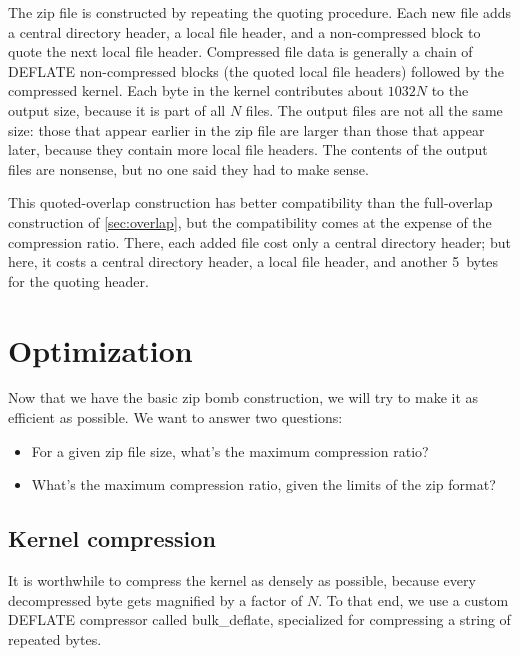 \documentclass[letterpaper,twocolumn,10pt]{article}
\newcommand{\bulkdeflate}{\mbox{bulk\_deflate}}
\begin{document}
The zip file is constructed by repeating the quoting procedure.
Each new file adds a central directory header,
a local file header,
and a non-compressed block to quote the next local file header.
Compressed file data is generally a chain of DEFLATE non-compressed blocks
(the quoted local file headers)
followed by the compressed kernel.
Each byte in the kernel contributes about
$\num{1032}N$ to the output size,
because it is part of all $N$ files.
The output files are not all the same size:
those that appear earlier in the zip file
are larger than those that appear later,
because they contain more local file headers.
The contents of the output files are nonsense,
but no one said they had to make sense.

This quoted-overlap construction has better compatibility
than the full-overlap construction of \autoref{sec:overlap},
but the compatibility comes at the expense of the compression ratio.
There, each added file cost only a central directory header;
but here, it costs a central directory header,
a local file header,
and another \SI{5}{bytes} for the quoting header.


\section{Optimization}
\label{sec:optimization}

Now that we have the basic zip bomb construction,
we will try to make it as efficient as possible.
We want to answer two questions:

\begin{itemize}
\item For a given zip file size, what's the maximum compression ratio?
\item What's the maximum compression ratio, given the limits of the zip format?
\end{itemize}

\subsection{Kernel compression}
\label{sec:bulkdeflate}

It is worthwhile to compress the kernel as densely as possible,
because every decompressed byte gets magnified by a factor of $N$.
To that end, we use a custom DEFLATE compressor
called \bulkdeflate,
specialized for compressing
a string of repeated bytes.

\end{document}
